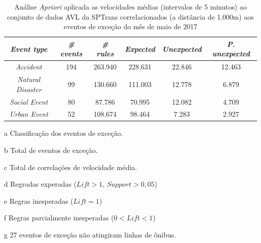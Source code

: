 \documentclass[
	12pt,				%
	oneside,			%
	a4paper,			%
	english,			%
	brazil				%
	]{abntex2ppgsi}
\begin{document}
{{\begin{apendicesenv}
\begin{table}[!htb]
\centering
\begin{threeparttable}
\caption {Análise \textit{Apriori} aplicada as velocidades médias (intervalos de 5 minutos) ao conjunto de dados AVL da SPTrans correlacionados (a distância de 1.000m) aos eventos de exceção do mês de maio de 2017}
\label {tab:aprioriFull}
\begin{tabular}{c|c|c|c|c|c}
\hline
\textbf{\textit{Event type}}\tnote{a} & \textbf{\textit{\# events}}\tnote{b} & \textit{\textbf{\# rules}}\tnote{c} & \textbf{\textit{Expected}}\tnote{d} & \textbf{\textit{Unexpected}}\tnote{e} & \textbf{\textit{P. unexpected}}\tnote{f}   \\
\hline
\textit{Accident} & 194 & 263.940 & 228.631 & 22.846 & 12.463 \\
\textit{Natural Disaster} & 99 & 130.660 & 111.003 & 12.778 & 6.879 \\
\textit{Social Event} & 80 & 87.786 & 70.995 & 12.082 & 4.709 \\
\textit{Urban Event} & 52 & 108.674 & 98.464 & 7.283 & 2.927 \\
\hline
\end{tabular}
\begin{tablenotes}
            \item[a] Classificação dos eventos de exceção.
            \item[b] Total de eventos de exceção.
            \item[c] Total de correlações de velocidade média.
            \item[d] Regradas experadas ($Lift > 1$, $Support > 0,05$)
            \item[e] Regras inesperadas ($Lift = 1$)
            \item[f] Regras parcialmente inesperadas ($0 < Lift < 1$)
            \item[g] 27 eventos de exceção não atingiram linhas de ônibus.
        \end{tablenotes}
\end{threeparttable}
\end{table}


\end{apendicesenv}}}
\end{document}

